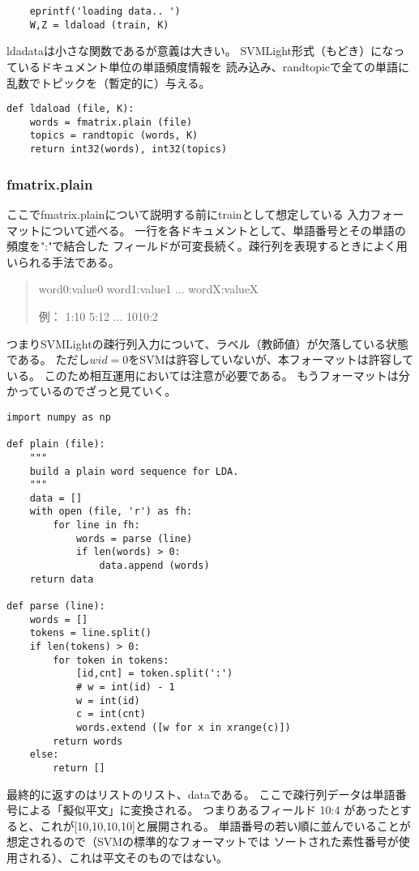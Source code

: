 \documentclass[uplatex]{jsarticle}
\begin{document}
\begin{lstlisting}
    eprintf('loading data.. ')
    W,Z = ldaload (train, K)
\end{lstlisting}

ldadataは小さな関数であるが意義は大きい。
SVMLight形式（もどき）になっているドキュメント単位の単語頻度情報を
読み込み、randtopicで全ての単語に乱数でトピックを（暫定的に）与える。

\begin{lstlisting}
def ldaload (file, K):
    words = fmatrix.plain (file)
    topics = randtopic (words, K)
    return int32(words), int32(topics)
\end{lstlisting}

\subsubsection{fmatrix.plain}

ここでfmatrix.plainについて説明する前にtrainとして想定している
入力フォーマットについて述べる。
一行を各ドキュメントとして、単語番号とその単語の頻度を":"で結合した
フィールドが可変長続く。疎行列を表現するときによく用いられる手法である。

\begin{quote}
word0:value0 word1:value1 ... wordX:valueX

例：
1:10 5:12 ... 1010:2
\end{quote}

つまりSVMLightの疎行列入力について、ラベル（教師値）が欠落している状態である。
ただし$wid=0$をSVMは許容していないが、本フォーマットは許容している。
このため相互運用においては注意が必要である。
もうフォーマットは分かっているのでざっと見ていく。
\begin{lstlisting}
import numpy as np

def plain (file):
    """
    build a plain word sequence for LDA.
    """
    data = []
    with open (file, 'r') as fh:
        for line in fh:
            words = parse (line)
            if len(words) > 0:
                data.append (words)
    return data

def parse (line):
    words = []
    tokens = line.split()
    if len(tokens) > 0:
        for token in tokens:
            [id,cnt] = token.split(':')
            # w = int(id) - 1
            w = int(id)
            c = int(cnt)
            words.extend ([w for x in xrange(c)])
        return words
    else:
        return []
\end{lstlisting}

最終的に返すのはリストのリスト、dataである。
ここで疎行列データは単語番号による「擬似平文」に変換される。
つまりあるフィールド 10:4 があったとすると、これが[10,10,10,10]と展開される。
単語番号の若い順に並んでいることが想定されるので（SVMの標準的なフォーマットでは
ソートされた素性番号が使用される）、これは平文そのものではない。
\end{document}
